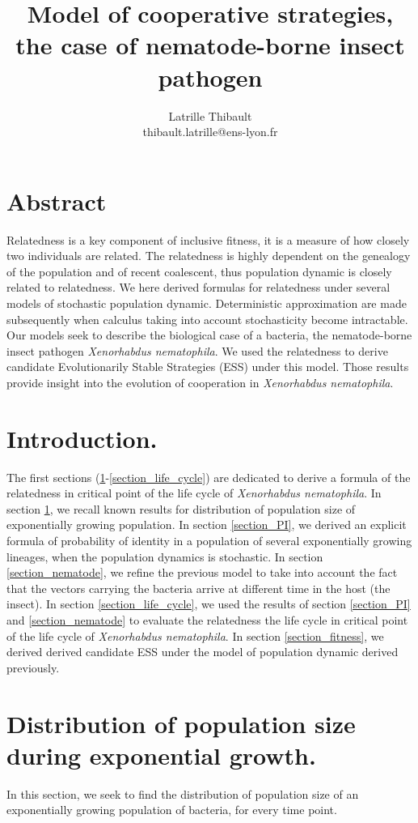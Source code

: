 \documentclass{article}
\author{Latrille Thibault\\
\small thibault.latrille@ens-lyon.fr\\[-0.8ex]}
\title{Model of cooperative strategies, the case of nematode-borne insect
pathogen \Xnema}
\newcommand{\Xnema}{\textit{Xenorhabdus nematophila}}
\begin{document}
%
\maketitle

\section*{Abstract}
Relatedness is a key component of inclusive fitness, it is a measure of how closely two individuals are related. The relatedness is highly dependent on the genealogy of the population and of recent coalescent, thus population dynamic is closely related to relatedness. We here derived formulas for relatedness under several models of stochastic population dynamic. Deterministic approximation are made subsequently when calculus taking into account stochasticity become intractable. Our models seek to describe the biological case of a bacteria, the nematode-borne insect pathogen \Xnema. 
We used the relatedness to derive candidate Evolutionarily Stable Strategies (ESS) under this model. Those results provide insight into the evolution of cooperation in \Xnema.
\section*{Introduction.}
The first sections (\ref{section_exp_growth}-\ref{section_life_cycle}) are dedicated to derive a formula of the relatedness in critical point of the life cycle of \Xnema. 
In section \ref{section_exp_growth}, we recall known results for distribution of population size of exponentially growing population.
In section \ref{section_PI}, we derived an explicit formula of probability of identity in a population of several exponentially growing lineages, when the population dynamics is stochastic.
In section \ref{section_nematode}, we refine the previous model to take into account the fact that the vectors carrying the bacteria arrive at different time in the host (the insect).
In section \ref{section_life_cycle}, we used the results of section \ref{section_PI} and \ref{section_nematode} to evaluate the relatedness the life cycle in critical point of the life cycle of \Xnema. 
In section \ref{section_fitness}, we derived derived candidate ESS under the model of population dynamic derived previously.
\section{Distribution of population size during exponential growth.}
\label{section_exp_growth}
In this section, we seek to find the distribution of population size of an exponentially growing population of bacteria, for every time point. 
\end{document}
